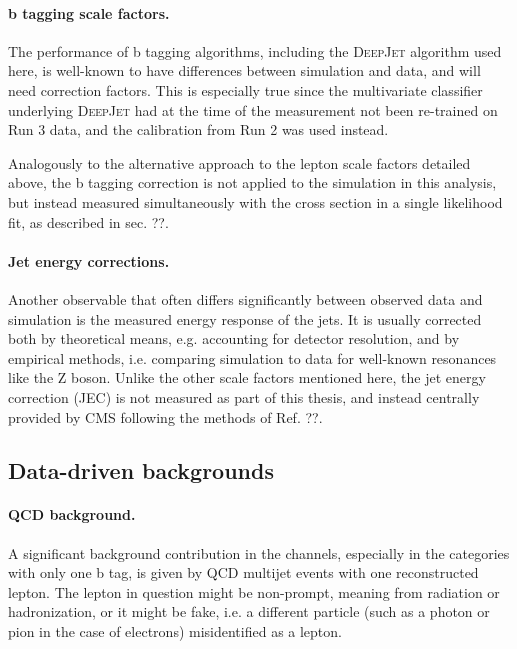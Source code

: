 \paragraph{b tagging scale factors.}

The performance of b tagging algorithms, including the \textsc{DeepJet} algorithm used here, is well-known to have differences between simulation and data, and will need correction factors. This is especially true since the multivariate classifier underlying \textsc{DeepJet} had at the time of the measurement not been re-trained on Run 3 data, and the calibration from Run 2 was used instead.

Analogously to the alternative approach to the lepton scale factors detailed above, the b tagging correction is not applied to the simulation in this analysis, but instead measured simultaneously with the \ttbar cross section in a single likelihood fit, as described in sec. ??.

\paragraph{Jet energy corrections.}

Another observable that often differs significantly between observed data and simulation is the measured energy response of the jets. It is usually corrected both by theoretical means, e.g. accounting for detector resolution, and by empirical methods, i.e. comparing simulation to data for well-known resonances like the Z boson. Unlike the other scale factors mentioned here, the jet energy correction (JEC) is not measured as part of this thesis, and instead centrally provided by CMS following the methods of Ref. ??. 

\subsection{Data-driven backgrounds}

\paragraph{QCD background.}

A significant background contribution in the \ljets channels, especially in the categories with only one b tag, is given by QCD multijet events with one reconstructed lepton. The lepton in question might be non-prompt, meaning from radiation or hadronization, or it might be fake, i.e. a different particle (such as a photon or pion in the case of electrons) misidentified as a lepton. 

